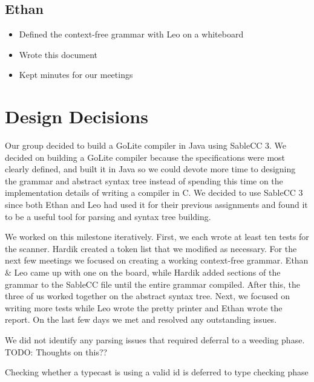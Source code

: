 \documentclass{article}
\begin{document}
\subsection*{Ethan}

\begin{itemize}
    \item Defined the context-free grammar with Leo on a whiteboard
    \item Wrote this document
    \item Kept minutes for our meetings
\end{itemize}

\section*{Design Decisions}

Our group decided to build a GoLite compiler in Java using SableCC 3. We decided on building a GoLite compiler because the specifications were most clearly defined, and built it in Java so we could devote more time to designing the grammar and abstract syntax tree instead of spending this time on the implementation details of writing a compiler in C. We decided to use SableCC 3 since both Ethan and Leo had used it for their previous assignments and found it to be a useful tool for parsing and syntax tree building.

We worked on this milestone iteratively. First, we each wrote at least ten tests for the scanner. Hardik created a token list that we modified as necessary. For the next few meetings we focused on creating a working context-free grammar. Ethan \& Leo came up with one on the board, while Hardik added sections of the grammar to the SableCC file until the entire grammar compiled. After this, the three of us worked together on the abstract syntax tree. Next, we focused on writing more tests while Leo wrote the pretty printer and Ethan wrote the report. On the last few days we met and resolved any outstanding issues.

We did not identify any parsing issues that required deferral to a weeding phase. TODO: Thoughts on this??

Checking whether a typecast is using a valid id is deferred to type checking phase
\end{document}
